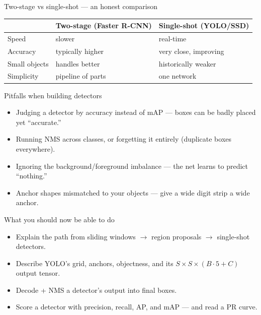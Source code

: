 \documentclass[10pt,aspectratio=169]{beamer}
\begin{document}
\begin{frame}{Two-stage vs single-shot --- an honest comparison}
  \begin{center}
  \begin{tabular}{@{}lll@{}}
    \toprule
    & \textbf{Two-stage (Faster R-CNN)} & \textbf{Single-shot (YOLO/SSD)} \\
    \midrule
    Speed    & slower & real-time \\
    Accuracy & typically higher & very close, improving \\
    Small objects & handles better & historically weaker \\
    Simplicity & pipeline of parts & one network \\
    \bottomrule
  \end{tabular}
  \end{center}
\end{frame}

\begin{frame}{Pitfalls when building detectors}
  \begin{badbox}
    \begin{itemize}
      \item Judging a detector by accuracy instead of mAP --- boxes can be badly placed yet ``accurate.''
      \item Running NMS across classes, or forgetting it entirely (duplicate boxes everywhere).
      \item Ignoring the background/foreground imbalance --- the net learns to predict ``nothing.''
      \item Anchor shapes mismatched to your objects --- give a wide digit strip a wide anchor.
    \end{itemize}
  \end{badbox}
\end{frame}

\begin{frame}{What you should now be able to do}
  \begin{itemize}
    \item Explain the path from sliding windows $\rightarrow$ region proposals $\rightarrow$ single-shot detectors.
    \item Describe YOLO's grid, anchors, objectness, and its $S\times S\times(B\cdot5+C)$ output tensor.
    \item Decode + NMS a detector's output into final boxes.
    \item Score a detector with precision, recall, AP, and mAP --- and read a PR curve.
  \end{itemize}
\end{frame}
\end{document}
